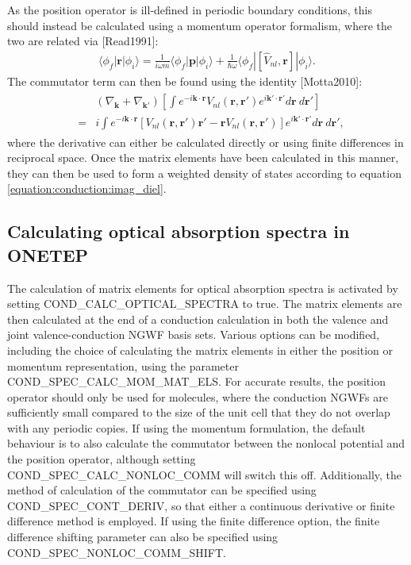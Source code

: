 \documentclass[letterpaper,10pt,english]{sphinxmanual}
\begin{document}
As the position operator is ill-defined in periodic boundary conditions,
this should instead be calculated using a momentum operator formalism,
where the two are related via {[}Read1991{]}:
\begin{equation*}
\begin{split}\langle\phi_f|\mathbf{r}|\phi_i\rangle = \frac{1}{i\omega m}\langle\phi_f|\mathbf{p}|\phi_i\rangle + \frac{1}{\hbar\omega}\langle\phi_f|\left[\hat{V}_{nl},\mathbf{r}\right]|\phi_i\rangle .\end{split}
\end{equation*}
The commutator term can then be found using the
identity {[}Motta2010{]}:
\begin{equation*}
\begin{split}\begin{aligned}
&&\left(\nabla_\mathbf{k}+\nabla_\mathbf{k'}\right)\left[\int e^{-i\mathbf{k}\cdot\mathbf{r}} V_{nl}\left(\mathbf{r},\mathbf{r'}\right) e^{i\mathbf{k'}\cdot\mathbf{r'}} d\mathbf{r}\ d\mathbf{r'}\right] \\
&=&i\int e^{-i\mathbf{k}\cdot\mathbf{r}}\left[V_{nl}\left(\mathbf{r},\mathbf{r'}\right)\mathbf{r'}-\mathbf{r}V_{nl}\left(\mathbf{r},\mathbf{r'}\right)\right] e^{i\mathbf{k'}\cdot\mathbf{r'}} d\mathbf{r}\ d\mathbf{r'} \nonumber,\end{aligned}\end{split}
\end{equation*}
where the derivative can either be calculated directly or using finite
differences in reciprocal space. Once the matrix elements have been
calculated in this manner, they can then be used to form a weighted
density of states according to equation \eqref{equation:conduction:imag_diel}.


\subsection{Calculating optical absorption spectra in ONETEP}
\label{\detokenize{conduction:calculating-optical-absorption-spectra-in-onetep}}
The calculation of matrix elements for optical absorption spectra is
activated by setting COND\_CALC\_OPTICAL\_SPECTRA to true. The matrix
elements are then calculated at the end of a conduction calculation in
both the valence and joint valence-conduction NGWF basis sets. Various
options can be modified, including the choice of calculating the matrix
elements in either the position or momentum representation, using the
parameter COND\_SPEC\_CALC\_MOM\_MAT\_ELS. For accurate results, the
position operator should only be used for molecules, where the
conduction NGWFs are sufficiently small compared to the size of the unit
cell that they do not overlap with any periodic copies. If using the
momentum formulation, the default behaviour is to also calculate the
commutator between the nonlocal potential and the position operator,
although setting COND\_SPEC\_CALC\_NONLOC\_COMM will switch this off.
Additionally, the method of calculation of the commutator can be
specified using COND\_SPEC\_CONT\_DERIV, so that either a continuous
derivative or finite difference method is employed. If using the finite
difference option, the finite difference shifting parameter can also be
specified using COND\_SPEC\_NONLOC\_COMM\_SHIFT.
\end{document}
